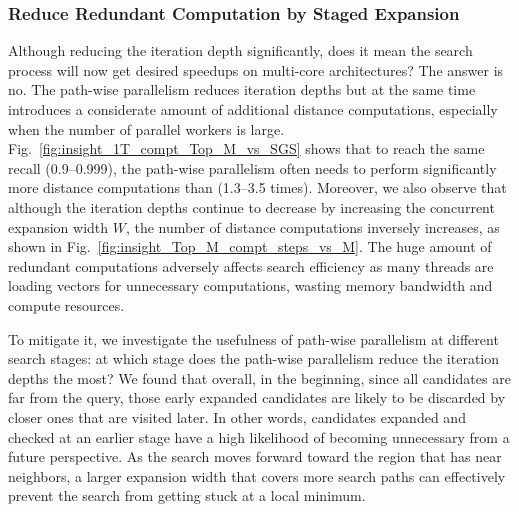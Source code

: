 \subsubsection{Reduce Redundant Computation by Staged Expansion}
\label{subsec:staged-expansion}

Although reducing the iteration depth significantly, does it mean the search process will now get desired speedups on multi-core architectures? The answer is no. The path-wise parallelism reduces iteration depths but at the same time introduces a considerate amount of additional distance computations, especially when the number of parallel workers is large. 
Fig.~\ref{fig:insight_1T_compt_Top_M_vs_SGS} shows that to reach the same recall (0.9--0.999), the path-wise parallelism often needs to perform significantly more distance computations than \SeqShortName (1.3--3.5 times). Moreover, we also observe that although the iteration depths continue to decrease by increasing the concurrent expansion width $W$, the number of distance computations inversely increases, as shown in Fig.~\ref{fig:insight_Top_M_compt_steps_vs_M}. 
The huge amount of redundant computations adversely affects search efficiency as many threads are loading vectors for unnecessary computations, wasting memory bandwidth and compute resources. 

To mitigate it, we investigate the usefulness of path-wise parallelism at different search stages: at which stage does the path-wise parallelism reduce the iteration depths the most? 
We found that overall, in the beginning, since all candidates are far from the query, those early expanded candidates are likely to be discarded by closer ones that are visited later. In other words, candidates expanded and checked at an earlier stage have a high likelihood of becoming unnecessary from a future perspective. As the search moves forward toward the region that has near neighbors, a larger expansion width that covers more search paths can effectively prevent the search from getting stuck at a local minimum.

